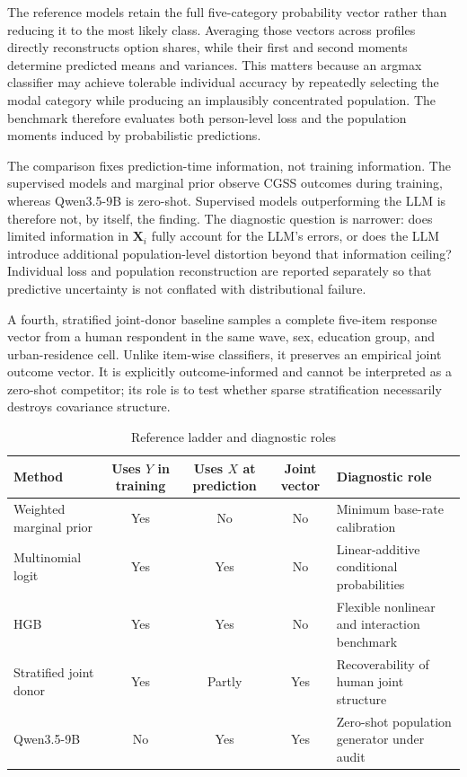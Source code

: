 \documentclass[11pt]{article}
\begin{document}
The reference models retain the full five-category probability vector rather than reducing it to the most likely class. Averaging those vectors across profiles directly reconstructs option shares, while their first and second moments determine predicted means and variances. This matters because an argmax classifier may achieve tolerable individual accuracy by repeatedly selecting the modal category while producing an implausibly concentrated population. The benchmark therefore evaluates both person-level loss and the population moments induced by probabilistic predictions.

The comparison fixes prediction-time information, not training information. The supervised models and marginal prior observe CGSS outcomes during training, whereas Qwen3.5-9B is zero-shot. Supervised models outperforming the LLM is therefore not, by itself, the finding. The diagnostic question is narrower: does limited information in $\bm{X}_i$ fully account for the LLM's errors, or does the LLM introduce additional population-level distortion beyond that information ceiling? Individual loss and population reconstruction are reported separately so that predictive uncertainty is not conflated with distributional failure.

A fourth, stratified joint-donor baseline samples a complete five-item response vector from a human respondent in the same wave, sex, education group, and urban-residence cell. Unlike item-wise classifiers, it preserves an empirical joint outcome vector. It is explicitly outcome-informed and cannot be interpreted as a zero-shot competitor; its role is to test whether sparse stratification necessarily destroys covariance structure.

\begin{table}[H]
\centering
\caption{Reference ladder and diagnostic roles}
\label{tab:reference-ladder}
\small
\begin{tabularx}{\textwidth}{lccc>{\raggedright\arraybackslash}X}
\toprule
Method & Uses $Y$ in training & Uses $X$ at prediction & Joint vector & Diagnostic role \\
\midrule
Weighted marginal prior & Yes & No & No & Minimum base-rate calibration \\
Multinomial logit & Yes & Yes & No & Linear-additive conditional probabilities \\
HGB & Yes & Yes & No & Flexible nonlinear and interaction benchmark \\
Stratified joint donor & Yes & Partly & Yes & Recoverability of human joint structure \\
Qwen3.5-9B & No & Yes & Yes & Zero-shot population generator under audit \\
\bottomrule
\end{tabularx}
\end{table}
\end{document}
